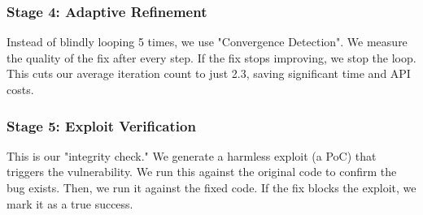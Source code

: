 \documentclass[conference]{IEEEtran}
\begin{document}
\subsubsection{Stage 4: Adaptive Refinement}
Instead of blindly looping 5 times, we use "Convergence Detection". We measure the quality of the fix after every step. If the fix stops improving, we stop the loop. This cuts our average iteration count to just 2.3, saving significant time and API costs.

\subsubsection{Stage 5: Exploit Verification}
This is our "integrity check." We generate a harmless exploit (a PoC) that triggers the vulnerability. We run this against the original code to confirm the bug exists. Then, we run it against the fixed code. If the fix blocks the exploit, we mark it as a true success.
\end{document}
